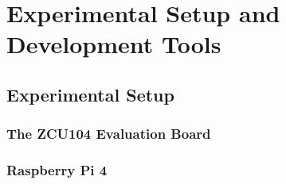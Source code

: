 %
\chapter{Experimental Setup and Development Tools}
\label{chap:setup}

\section{Experimental Setup}
\label{sec:setup}

\subsection{The ZCU104 Evaluation Board}
\label{sec:zcu104}

\subsection{Raspberry Pi 4}
\label{sec:rpi4}

